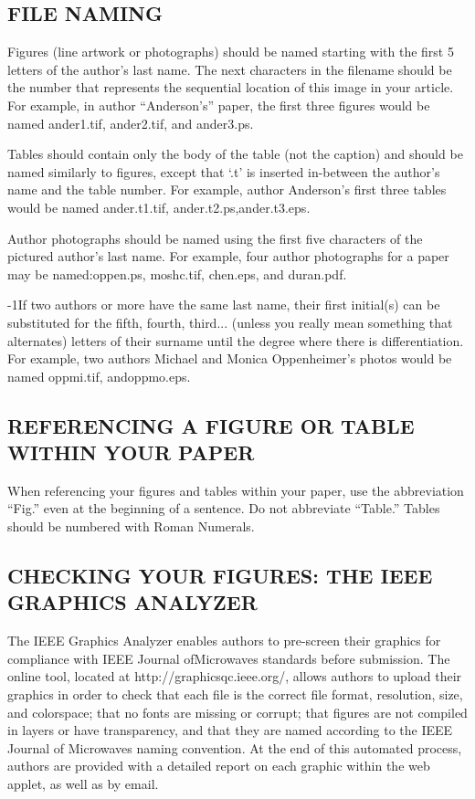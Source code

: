 \documentclass{IEEEjmw}
\begin{document}
\subsection{FILE NAMING}

Figures (line artwork or photographs) should be named starting with the first 5 letters of the author's last name. The next characters in the filename should be the number that represents the sequential location of this image in your article. For example, in author ``Anderson's'' paper, the first three figures would be named ander1.tif, ander2.tif, and ander3.ps.

Tables should contain only the body of the table (not the caption) and should be named similarly to figures, except that `.t' is inserted in-between the author's name and the table number. For example, author Anderson's first three tables would be named ander.t1.tif, ander.t2.ps,\break ander.t3.eps.

Author photographs should be named using the first five characters of the pictured author's last name. For example, four author photographs for a paper may be named:\break oppen.ps, moshc.tif, chen.eps, and duran.pdf.

\looseness-1If two authors or more have the same last name, their first initial(s) can be substituted for the fifth, fourth, third... (unless  you  really  mean  something  that  alternates) letters of their surname until the degree where there is differentiation. For example, two authors Michael and Monica Oppenheimer's photos would be named oppmi.tif, and\break oppmo.eps.

\subsection{REFERENCING A FIGURE OR TABLE WITHIN YOUR PAPER}
 
When referencing your figures and tables within your paper, use the abbreviation ``Fig.'' even at the beginning of a sentence. Do not abbreviate ``Table.'' Tables should be numbered with Roman Numerals.

\subsection{CHECKING YOUR FIGURES: THE IEEE GRAPHICS ANALYZER}

The IEEE Graphics Analyzer enables authors to pre-screen their graphics for compliance with IEEE Journal of\break Microwaves standards before submission. The online tool, located at http://graphicsqc.ieee.org/, allows authors to upload their graphics in order to check that each file is the correct file format, resolution, size, and colorspace; that no fonts are missing or corrupt; that figures are not compiled in layers or have transparency, and that they are named according to the IEEE Journal  of Microwaves naming convention. At the end of this automated process, authors are provided with a detailed report on each graphic within the web applet, as well as by email.
\end{document}
